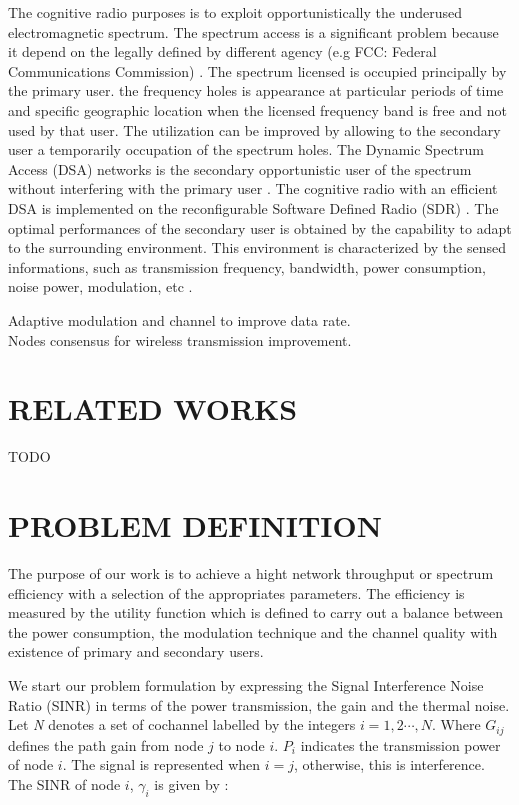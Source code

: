 \documentclass[conference]{IEEEtran}
\begin{document}
The cognitive radio purposes is to exploit opportunistically the underused electromagnetic spectrum. The spectrum access is a significant problem because it depend on the legally defined by different agency (e.g FCC: Federal Communications Commission) \cite{Haykin2005}. The spectrum licensed is occupied principally by the primary user. the frequency holes is appearance at particular periods of time and specific geographic location when the licensed frequency band is free and not used by that user. The utilization can be improved by allowing to the secondary user a temporarily occupation of the spectrum holes. The Dynamic Spectrum Access (DSA) networks is the secondary opportunistic user of the spectrum without interfering with the primary user \cite{Liu2011}. The cognitive radio with an efficient DSA is implemented on the reconfigurable Software Defined Radio (SDR) \cite{Mitola1993}. The optimal performances of the secondary user is obtained by the capability to adapt to the surrounding environment. This environment is characterized by the sensed informations, such as transmission frequency, bandwidth, power consumption, noise power, modulation, etc \cite{Liu2011}. 



Adaptive modulation and channel to improve data rate. \\

Nodes consensus for wireless transmission improvement.\\

\section{RELATED WORKS}


TODO

\section{PROBLEM DEFINITION}
The purpose of our work is to achieve a hight network throughput or spectrum efficiency with a selection of the appropriates parameters. The efficiency is measured by the utility function which is defined to carry out a balance between the power consumption, the modulation technique and the channel quality with existence of primary and secondary users.

We start our problem formulation by expressing the Signal Interference Noise Ratio (SINR) in terms of the power transmission, the gain and the thermal noise. Let \textit{N} denotes a set of cochannel labelled  by the integers $i=1,2 \cdots,N$. Where $G_{ij}$ defines the path gain from node $j$ to node $i$. $P_{i}$ indicates the transmission power of node $i$. The signal is represented when $i=j$, otherwise, this is interference. The SINR of node $i$, $\gamma_{i}$ is given by :
 
\end{document}
